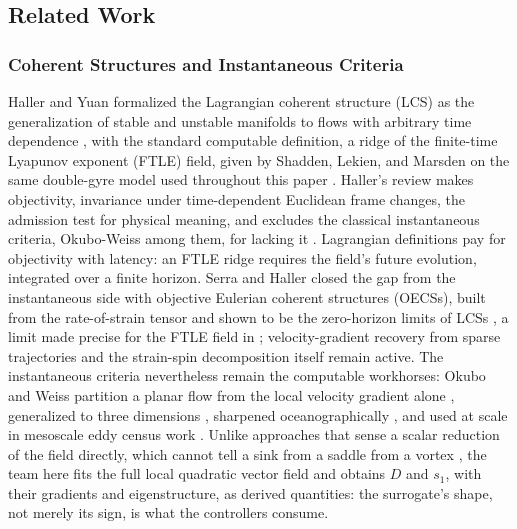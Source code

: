 \documentclass[lettersize,journal]{IEEEtran}
\begin{document}

\subsection{Related Work}
\label{sec:related_robots}

\subsubsection{Coherent Structures and Instantaneous Criteria}
Haller and Yuan formalized the Lagrangian coherent structure (LCS) as
the generalization of stable and unstable manifolds to flows with
arbitrary time dependence \cite{6}, with the standard computable
definition, a ridge of the finite-time Lyapunov exponent (FTLE) field,
given by Shadden, Lekien, and Marsden on the same double-gyre model
used throughout this paper \cite{8}. Haller's review makes objectivity,
invariance under time-dependent Euclidean frame changes, the admission
test for physical meaning, and excludes the classical instantaneous
criteria, Okubo-Weiss among them, for lacking it \cite{16}. Lagrangian
definitions pay for objectivity with latency: an FTLE ridge requires
the field's future evolution, integrated over a finite horizon. Serra
and Haller closed the gap from the instantaneous side with objective
Eulerian coherent structures (OECSs), built from the rate-of-strain
tensor and shown to be the zero-horizon limits of LCSs \cite{17}, a
limit made precise for the FTLE field in \cite{18}; velocity-gradient
recovery from sparse trajectories \cite{19} and the strain-spin
decomposition itself \cite{20} remain active. The instantaneous
criteria nevertheless remain the computable workhorses: Okubo and Weiss
partition a planar flow from the local velocity gradient alone
\cite{21,22}, generalized to three dimensions \cite{23}, sharpened
oceanographically \cite{24}, and used at scale in mesoscale eddy census
work \cite{5}. Unlike approaches that sense a scalar reduction of the
field directly, which cannot tell a sink from a saddle from a vortex
\cite{25}, the team here fits the full local quadratic vector field and
obtains $D$ and $s_1$, with their gradients and eigenstructure, as
derived quantities: the surrogate's shape, not merely its sign, is what
the controllers consume.
\end{document}
